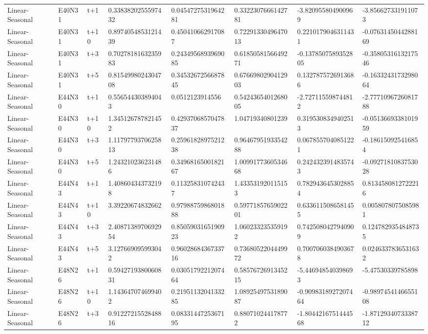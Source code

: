 \begin{landscape}
\begin{longtable}{llllllll}
Linear-Seasonal & E40N31 & t+1 & 0.3383820255597432 & 0.0454727531964281 & 0.3322307666142781 & -3.820955804900969 & -3.856627331911073 \\
Linear-Seasonal & E40N31 & t+10 & 0.8974054853121439 & 0.450410662917087 & 0.7229133049647013 & 0.2210179046311431 & -0.0763145044288169 \\
Linear-Seasonal & E40N31 & t+3 & 0.7027818163235983 & 0.2434956893969085 & 0.6185058156649271 & -0.1378507589352805 & -0.3580531613217546 \\
Linear-Seasonal & E40N31 & t+5 & 0.8154998024304708 & 0.3453267256687845 & 0.6766980290412903 & 0.1327875726913686 & -0.1633243173298064 \\
Linear-Seasonal & E44N30 & t+1 & 0.556544303894043 & 0.0512123914556 & 0.5424365401268005 & -2.727115598744812 & -2.7771096726081788 \\
Linear-Seasonal & E44N30 & t+10 & 1.345126787821452 & 0.4293706857047837 & 1.04719340801239 & 0.3195308349402513 & -0.0513669338101959 \\
Linear-Seasonal & E44N30 & t+3 & 1.1179779370625813 & 0.2596182897521238 & 0.9646795193354288 & 0.0678557040851221 & -0.186150925416854 \\
Linear-Seasonal & E44N30 & t+5 & 1.243210236231486 & 0.3496816500182167 & 1.0099177360534668 & 0.2424323914835743 & -0.0927181083753028 \\
Linear-Seasonal & E44N43 & t+1 & 1.408604343732198 & 0.113258310742437 & 1.433531920115153 & 0.7829436453028854 & 0.8134580812722216 \\
Linear-Seasonal & E44N43 & t+10 & 3.39220674832662 & 0.9798875986801888 & 0.5977185765902201 & 0.6336115086581455 & 0.0058078075085981 \\
Linear-Seasonal & E44N43 & t+3 & 2.4087138970692954 & 0.8505903165190923 & 1.060233235359192 & 0.7425080427940909 & 0.1247829354848735 \\
Linear-Seasonal & E44N43 & t+5 & 3.127669095993042 & 0.9602868436733716 & 0.7368052204449972 & 0.7007060384903678 & 0.0246337836531632 \\
Linear-Seasonal & E48N26 & t+1 & 0.5942719380060831 & 0.0305179221207464 & 0.5857672691345215 & -5.446948540398693 & -5.47530339785898 \\
Linear-Seasonal & E48N26 & t+10 & 1.143647074699402 & 0.2195113204133285 & 1.0892549753189087 & -0.9098318927207464 & -0.9897454146655108 \\
Linear-Seasonal & E48N26 & t+3 & 0.9122721552848816 & 0.0833144725367195 & 0.880710244178772 & -1.8044216751444568 & -1.8712934073338712 \\

\end{longtable}
\end{landscape}
